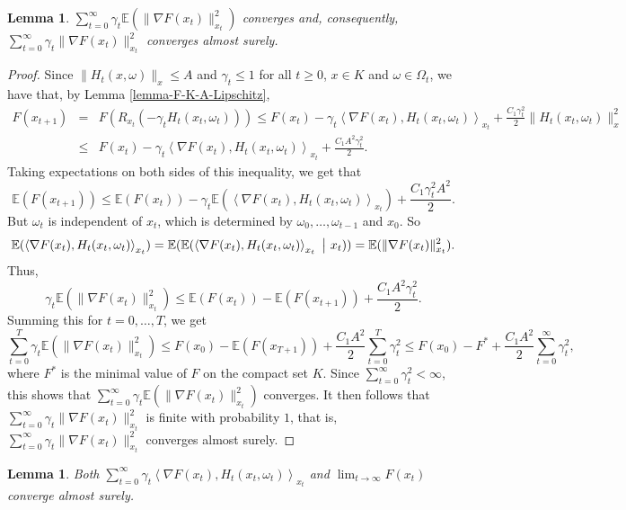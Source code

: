 \documentclass{amsart}
\newcommand{\E}{\mathbb{E}}
\newcommand{\g}{\gamma}
\theoremstyle{plain}
\newtheorem{lemma}[theorem]{Lemma}
\theoremstyle{definition}
\theoremstyle{remark}
\numberwithin{theorem}{section}
\numberwithin{equation}{section}
\begin{document}
\begin{lemma}\label{lemma-expectation-converges}
$\sum_{t=0}^\infty \g_t \E(\|\nabla F(x_t)\|_{x_t}^2)$ converges and, consequently, $\sum_{t=0}^\infty \g_t \|\nabla F(x_t)\|_{x_t}^2$ converges almost surely.
\end{lemma}

\begin{proof}
Since $\| H_t(x,\omega)\|_x \leq A$ and $\g_t\leq 1$ for all $t\geq 0$, $x \in K$ and $\omega \in \Omega_t$, we have that, by Lemma \ref{lemma-F-K-A-Lipschitz},  
\begin{eqnarray}
\label{eq-expectation-converges-0} F(x_{t+1}) & = & F(R_{x_t}(-\g_t H_t(x_t,\omega_t))) \leq F(x_t) - \g_t\left\langle \nabla F(x_t), H_t(x_t,\omega_t) \right\rangle_{x_t} + \frac{C_1\g_t^2}{2}\|H_t(x_t,\omega_t)\|_x^2\\
\nonumber & \leq & F(x_t) - \g_t\left\langle \nabla F(x_t), H_t(x_t,\omega_t) \right\rangle_{x_t} + \frac{C_1A^2\g_t^2}{2}.
\end{eqnarray}
Taking expectations on both sides of this inequality, we get that
\[
\E(F(x_{t+1})) \leq \E(F(x_t)) - \g_t\E(\left\langle \nabla F(x_t), H_t(x_t,\omega_t) \right\rangle_{x_t}) + \frac{C_1\g_t^2A^2}{2}.
\]
But $\omega_t$ is independent of $x_t$, which is determined by $\omega_0,\dots, \omega_{t-1}$ and $x_0$. So
\begin{equation}\label{eq-expectation-converges-1}
\E(\left\langle \nabla F(x_t), H_t(x_t,\omega_t) \right\rangle_{x_t}) = \E(\E(\left\langle \nabla F(x_t), H_t(x_t,\omega_t) \right\rangle_{x_t}~\big{|}~x_t)) = \E(\|\nabla F (x_t)\|_{x_t}^2).
\end{equation}
Thus, 
\[
\g_t \E(\|\nabla F(x_t)\|_{x_t}^2) \leq \E(F(x_t)) - \E(F(x_{t+1})) + \frac{C_1A^2\g_t^2}{2}.
\]
Summing this for $t=0,\dots,T$, we get
\[
\sum_{t=0}^T \g_t \E(\|\nabla F(x_t)\|_{x_t}^2) \leq F(x_0) - \E(F(x_{T+1})) + \frac{C_1A^2}{2}\sum_{t=0}^T\g_t^2 \leq F(x_0) - F^\ast + \frac{C_1A^2}{2}\sum_{t=0}^\infty\g_t^2,
\]
where $F^\ast$ is the minimal value of $F$ on the compact set $K$. Since $\sum_{t=0}^\infty\g_t^2 <\infty$, this shows that $\sum_{t=0}^\infty \g_t \E(\|\nabla F(x_t)\|_{x_t}^2)$ converges. It then follows that $\sum_{t=0}^\infty \g_t \|\nabla F(x_t)\|_{x_t}^2$ is finite with probability $1$, that is, $\sum_{t=0}^\infty \g_t \|\nabla F(x_t)\|_{x_t}^2$ converges almost surely. 
\end{proof}

\begin{lemma}\label{lemma-F-x-t-converge}
Both $\sum_{t=0}^\infty \g_t\left\langle \nabla F(x_t), H_t(x_t,\omega_t)\right\rangle_{x_t}$ and $\lim_{t\rightarrow \infty} F(x_t)$ converge almost surely.
\end{lemma}
\end{document}

